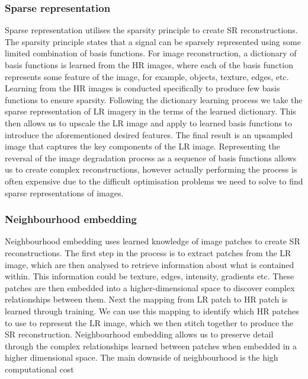 \subsubsection{Sparse representation}
Sparse representation utilises the sparsity principle to create SR reconstructions. The sparsity principle states that a signal can be sparsely represented using some limited combination of basis functions. For image reconstruction, a dictionary of basis functions is learned from the HR images, where each of the basis function represents some feature of the image, for example, objects, texture, edges, etc. Learning from the HR images is conducted specifically to produce few basis functions to ensure sparsity. Following the dictionary learning process we take the sparse representation of LR imagery in the terms of the learned dictionary. This then allows us to upscale the LR image and apply to learned basis functions to introduce the aforementioned desired features. The final result is an upsampled image that captures the key components of the LR image. Representing the reversal of the image degradation process as a sequence of basis functions allows us to create complex reconstructions, however actually performing the process is often expensive due to the difficult optimisation problems we need to solve to find sparse representations of images.

\subsubsection{Neighbourhood embedding}
Neighbourhood embedding uses learned knowledge of image patches to create SR reconstructions. The first step in the process is to extract patches from the LR image, which are then analysed to retrieve information about what is contained within. This information could be texture, edges, intensity, gradients etc. These patches are then embedded into a higher-dimensional space to discover complex relationships between them. Next the mapping from LR patch to HR patch is learned through training. We can use this mapping to identify which HR patches to use to represent the LR image, which we then stitch together to produce the SR reconstruction. Neighbourhood embedding allows us to preserve detail through the complex relationships learned between patches when embedded in a higher dimensional space. The main downside of neighbourhood is the high computational cost

